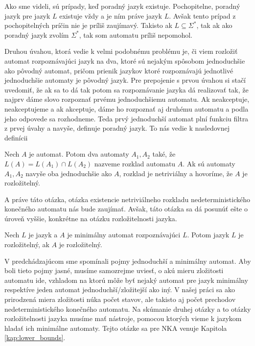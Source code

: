 Ako sme videli, sú prípady, keď poradný jazyk existuje. Pochopitelne, poradný jazyk pre jazyk $ L $ existuje vždy a je ním práve jazyk $ L $. Avšak tento prípad z pochopitelných príčin nie je príliš zaujímavý. Takisto ak $ L \subseteq  \Sigma^*$, tak ak ako poradný jazyk zvolím $ \Sigma^* $, tak som automatu príliš nepomohol.
\par
Druhou úvahou, ktorá vedie k velmi podobnému problému je, či viem rozložiť automat rozpoznávajúci jazyk na dva, ktoré sú nejakým spôsobom jednoduchšie ako pôvodný automat, pričom prienik jazykov ktoré rozpoznávajú jednotlivé jednoduchšie automaty je pôvodný jazyk. Pre prepojenie s prvou úvahou si stačí uvedomiť, že ak sa to dá tak potom sa rozpoznávanie jazyka dá realizovať tak, že najprv dáme slovo rozpoznať prvému jednoduchšiemu automatu. Ak neakceptuje, neakceptujeme a ak akceptuje, dáme ho rozpoznať aj druhému automatu a podla jeho odpovede sa rozhodneme. Teda prvý jednoduchší automat plní funkciu filtra z prvej úvahy a navyše, definuje poradný jazyk. To nás vedie k nasledovnej definícii

\begin{definition}
Nech $ A $ je automat. Potom dva automaty $ A_1, A_2 $ také, že $ L(A)=L(A_1) \cap L(A_2) $ nazveme rozklad automatu $ A $. Ak sú automaty $ A_1, A_2 $ navyše oba jednoduchšie ako $ A $, rozklad je netriviálny a hovoríme, že $ A $ je rozložitelný.
\end{definition}

A práve táto otázka, otázka existencie netriviálneho rozkladu nedeterministického konečného automatu nás bude zaujímať. Avšak, táto otázka sa dá posunúť ešte o úroveň vyššie, konkrétne na otázku rozložitelnosti jazyka.

\begin{definition}
Nech $ L $ je jazyk a $ A $ je minimálny automat rozpoznávajúci $ L $. Potom jazyk $ L $ je rozložitelný, ak $ A $ je rozložitelný.
\end{definition}

V predchádzajúcom sme spomínali pojmy jednoduchší a minimálny automat. Aby boli tieto pojmy jasné, musíme samozrejme uviesť, o akú mieru zložitosti automatu ide, vzhladom na ktorú môže byť nejaký automat pre jazyk minimálny respektíve jeden automat jednoduchší/zložitejší ako iný. V našej práci sa ako prirodzená miera zložitosti núka počet stavov, ale takisto aj počet prechodov nedeterministického konečného automatu. Na skúmanie druhej otázky a to otázky rozložitelnosti jazyka musíme mať nástroje, pomocou ktorých vieme k jazykom hladať ich minimálne automaty. Tejto otázke sa pre NKA venuje Kapitola \ref{kap:lower_bounds}.

